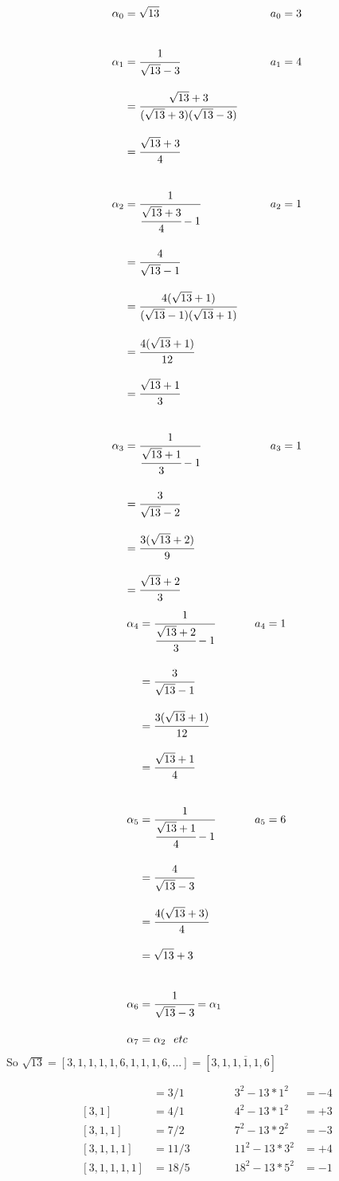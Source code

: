 \documentclass[11pt]{article}
\begin{document}
\begin{align*}
	\alpha_0 &= \sqrt{13} &&&&& a_0 &= 3\\[2em]
	\alpha_1 &= \cfrac{1}{\sqrt{13}-3} &&&&& a_1&=4\\[1em]
	&= \cfrac{\sqrt{13}+3}{(\sqrt{13}+3)(\sqrt{13}-3)}\\[1em]
	&=\cfrac{\sqrt{13}+3}{4} \\[2em]
	\alpha_2 &= \cfrac{1}{\cfrac{\sqrt{13}+3}{4}-1}   &&&&& a_2 &= 1\\[1em]
	&= \cfrac{4}{\sqrt{13}-1} \\[1em]
	&=\cfrac{4(\sqrt{13}+1)}{(\sqrt{13}-1)(\sqrt{13}+1)} \\[1em]
	&= \cfrac{4(\sqrt{13}+1)}{12} \\[1em]
	&=\cfrac{\sqrt{13}+1}{3}  \\[2em]
	\alpha_3 &= \cfrac{1}{\cfrac{\sqrt{13}+1}{3}-1} &&&&& a_3&=1\\[1em]
	&= \cfrac{3}{\sqrt{13}-2} \\[1em]
	&= \cfrac{3(\sqrt{13}+2)}{9} \\[1em]
	&= \cfrac{\sqrt{13}+2}{3}
\end{align*}
\begin{align*}
	\alpha_4 & = \cfrac{1}{\cfrac{\sqrt{13}+2}{3}-1} &&&&& a_4 &=1\\[1em]
	& = \cfrac{3}{\sqrt{13}-1}\\[1em]
	&= \cfrac{3(\sqrt{13}+1)}{12}\\[1em]
	&= \cfrac{\sqrt{13}+1}{4}\\[2em]
	\alpha_5 & = \cfrac{1}{\cfrac{\sqrt{13}+1}{4}-1} &&&&& a_5 &= 6\\[1em]
	&= \cfrac{4}{\sqrt{13}-3} \\[1em]
	&= \cfrac{4(\sqrt{13}+3)}{4}\\[1em]
	&=  \sqrt{13}+3\\[2em]
	\alpha_6 &= \cfrac{1}{\sqrt{13}-3} = \alpha_1\\[1em]
	\alpha_7 &= \alpha_2 \hspace{7pt} etc
\end{align*}
$ $\\[1em]
So $\sqrt{13} = [3,1,1,1,1,6,1,1,1,6,\dots] = [3,\overline{1,1,1,1,6}]$ 

\begin{align*}
	[3] &= 3/1 &&&&& 3^2-13*1^2&=-4\\
	[3,1] &=4/1 &&&&& 4^2-13*1^2 &=+3\\
	[3,1,1] &= 7/2 &&&&& 7^2 -13*2^2 &= -3\\
	[3,1,1,1] &=11/3 &&&&& 11^2 -13*3^2 &=+4\\
	[3,1,1,1,1] &= 18/5 &&&&& 18^2 -13*5^2 &=-1
\end{align*}
\end{document}
